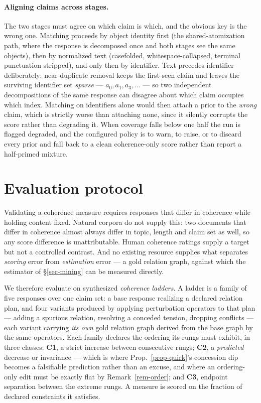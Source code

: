 \paragraph{Aligning claims across stages.} The two stages must agree on which claim is which, and the
obvious key is the wrong one. Matching proceeds by object identity first (the shared-atomization path,
where the response is decomposed once and both stages see the same objects), then by normalized text
(casefolded, whitespace-collapsed, terminal punctuation stripped), and only then by identifier. Text
precedes identifier deliberately: near-duplicate removal keeps the first-seen claim and leaves the
surviving identifier set \emph{sparse} --- $a_0, a_1, a_3, \dots$ --- so two independent
decompositions of the same response can disagree about which claim occupies which index. Matching on
identifiers alone would then attach a prior to the \emph{wrong} claim, which is strictly worse than
attaching none, since it silently corrupts the score rather than degrading it. When coverage falls
below one half the run is flagged degraded, and the configured policy is to warn, to raise, or to
discard every prior and fall back to a clean coherence-only score rather than report a half-primed
mixture.

\section{Evaluation protocol}
\label{sec-locobench}

Validating a coherence measure requires responses that differ in coherence while holding content
fixed. Natural corpora do not supply this: two documents that differ in coherence almost always
differ in topic, length and claim set as well, so any score difference is unattributable. Human
coherence ratings supply a target but not a controlled contrast. And no existing resource supplies
what separates \emph{scoring} error from \emph{estimation} error --- a gold relation graph, against
which the estimator of \S\ref{sec-mining} can be measured directly.

We therefore evaluate on synthesized \emph{coherence ladders}. A ladder is a family of five responses
over one claim set: a base response realizing a declared relation plan, and four variants produced by
applying perturbation operators to that plan --- adding a spurious relation, resolving a conceded
tension, dropping conflicts --- each variant carrying \emph{its own} gold relation graph derived from
the base graph by the same operators. Each family declares the ordering its rungs must exhibit, in
three classes: \textbf{C1}, a strict increase between consecutive rungs; \textbf{C2}, a
\emph{predicted} decrease or invariance --- which is where Prop.~\ref{prop-quirk}'s concession dip
becomes a falsifiable prediction rather than an excuse, and where an ordering-only edit must be
exactly flat by Remark~\ref{rem-order}; and \textbf{C3}, endpoint separation between the extreme
rungs. A measure is scored on the fraction of declared constraints it satisfies.

